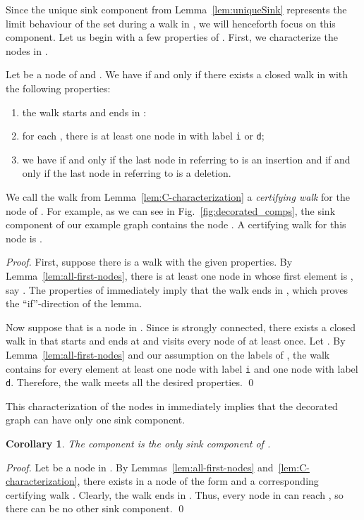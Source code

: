 \documentclass[oribibl,envcountsect,envcountsame]{llncs}
\newtheorem{corol}[theorem]{Corollary}
\begin{document}
Since the unique sink component  
from Lemma~\ref{lem:uniqueSink} represents the
limit behaviour of the set  during a walk in , we will
henceforth focus on this component.
Let us begin with a few properties of .
First, we characterize the nodes in .
\begin{lemma}\label{lem:C-characterization}
Let  be a node of  and . We have
 if and only if there exists a closed walk  in  
with the following properties:
\begin{enumerate}
  \item the walk  starts and ends in :
  \item for each , there is at least one node in  with
     label \texttt{i} or \texttt{d};
  \item we have  if and only  if the last node in  referring 
  to  is an insertion and  if and only if the last node 
	in  referring to  is a deletion.
\end{enumerate}
\end{lemma}

\noindent
We call the walk  from Lemma~\ref{lem:C-characterization}
a \emph{certifying walk} for the node  of .
For example, as we can see in Fig.~\ref{fig:decorated_comps},
the sink component of our example graph contains the node
. A certifying walk for this node is
.
\begin{proof}
First, suppose there is a walk with the given properties.
By Lemma~\ref{lem:all-first-nodes}, there is at least one  node 
in  whose first element is , say . 
The properties of  immediately imply that 
the walk  ends in , which proves the 
``if''-direction of the lemma.

Now suppose that  is a node in . Since  is strongly connected,
there exists a closed walk  in  that starts and ends at  and
visits every node of  at least once. Let . 
By Lemma~\ref{lem:all-first-nodes} and our assumption on the labels
of , the walk  contains for every element  
at least one node
with label \texttt{i} and one node with label \texttt{d}.
Therefore, the walk  meets all the desired properties.
\qed\end{proof}

This characterization of the nodes in  immediately implies
that the decorated graph can have only one sink component.

\begin{corol}
The component  is the only sink component of .
\end{corol}
\begin{proof}
Let  be a node in . By Lemmas~\ref{lem:all-first-nodes} 
and~\ref{lem:C-characterization}, there exists in  a node 
of the form  and a
corresponding certifying walk . Clearly, the walk  ends 
in . Thus, every node in  can reach , so there
can be no other sink component. 
\qed\end{proof}
\end{document}
